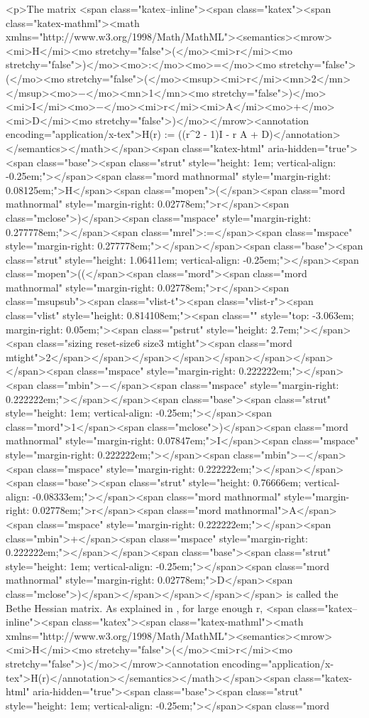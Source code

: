 <p>The matrix <span class="katex--inline"><span class="katex"><span class="katex-mathml"><math xmlns="http://www.w3.org/1998/Math/MathML"><semantics><mrow><mi>H</mi><mo stretchy="false">(</mo><mi>r</mi><mo stretchy="false">)</mo><mo>:</mo><mo>=</mo><mo stretchy="false">(</mo><mo stretchy="false">(</mo><msup><mi>r</mi><mn>2</mn></msup><mo>−</mo><mn>1</mn><mo stretchy="false">)</mo><mi>I</mi><mo>−</mo><mi>r</mi><mi>A</mi><mo>+</mo><mi>D</mi><mo stretchy="false">)</mo></mrow><annotation encoding="application/x-tex">H(r) := ((r^2 - 1)I - r A + D)</annotation></semantics></math></span><span class="katex-html" aria-hidden="true"><span class="base"><span class="strut" style="height: 1em; vertical-align: -0.25em;"></span><span class="mord mathnormal" style="margin-right: 0.08125em;">H</span><span class="mopen">(</span><span class="mord mathnormal" style="margin-right: 0.02778em;">r</span><span class="mclose">)</span><span class="mspace" style="margin-right: 0.277778em;"></span><span class="mrel">:=</span><span class="mspace" style="margin-right: 0.277778em;"></span></span><span class="base"><span class="strut" style="height: 1.06411em; vertical-align: -0.25em;"></span><span class="mopen">((</span><span class="mord"><span class="mord mathnormal" style="margin-right: 0.02778em;">r</span><span class="msupsub"><span class="vlist-t"><span class="vlist-r"><span class="vlist" style="height: 0.814108em;"><span class="" style="top: -3.063em; margin-right: 0.05em;"><span class="pstrut" style="height: 2.7em;"></span><span class="sizing reset-size6 size3 mtight"><span class="mord mtight">2</span></span></span></span></span></span></span></span><span class="mspace" style="margin-right: 0.222222em;"></span><span class="mbin">−</span><span class="mspace" style="margin-right: 0.222222em;"></span></span><span class="base"><span class="strut" style="height: 1em; vertical-align: -0.25em;"></span><span class="mord">1</span><span class="mclose">)</span><span class="mord mathnormal" style="margin-right: 0.07847em;">I</span><span class="mspace" style="margin-right: 0.222222em;"></span><span class="mbin">−</span><span class="mspace" style="margin-right: 0.222222em;"></span></span><span class="base"><span class="strut" style="height: 0.76666em; vertical-align: -0.08333em;"></span><span class="mord mathnormal" style="margin-right: 0.02778em;">r</span><span class="mord mathnormal">A</span><span class="mspace" style="margin-right: 0.222222em;"></span><span class="mbin">+</span><span class="mspace" style="margin-right: 0.222222em;"></span></span><span class="base"><span class="strut" style="height: 1em; vertical-align: -0.25em;"></span><span class="mord mathnormal" style="margin-right: 0.02778em;">D</span><span class="mclose">)</span></span></span></span></span> is called the Bethe Hessian matrix. As explained in \cite{SaadeBethe}, for large enough r, <span class="katex--inline"><span class="katex"><span class="katex-mathml"><math xmlns="http://www.w3.org/1998/Math/MathML"><semantics><mrow><mi>H</mi><mo stretchy="false">(</mo><mi>r</mi><mo stretchy="false">)</mo></mrow><annotation encoding="application/x-tex">H(r)</annotation></semantics></math></span><span class="katex-html" aria-hidden="true"><span class="base"><span class="strut" style="height: 1em; vertical-align: -0.25em;"></span><span class="mord 